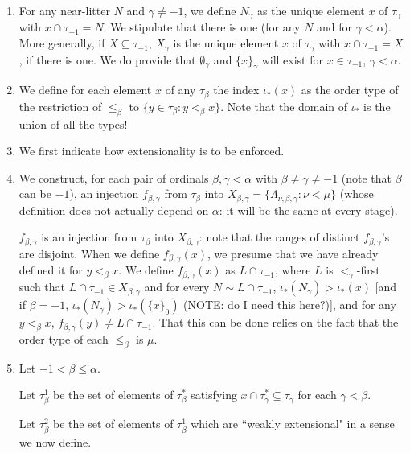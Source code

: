 \documentclass[12pt]{article}
\begin{document}
\begin{enumerate}
\item For any near-litter $N$ and $\gamma\neq -1$, we define $N_\gamma$ as the unique element $x$  of $\tau_\gamma$ with $x \cap \tau_{-1} = N$.  We stipulate that there is one (for any $N$ and for $\gamma<\alpha$).  More generally, if
$X \subseteq \tau_{-1}$, $X_\gamma$ is the unique element $x$ of $\tau_\gamma$ with $x \cap \tau_{-1} = X$, if there is one.  We do provide that $\emptyset_\gamma$ and $\{x\}_\gamma$ will exist
for $x \in \tau_{-1}$, $\gamma<\alpha$.

\item We define for each element $x$ of any $\tau_\beta$ the index $\iota_*(x)$
as the order type of the restriction of $\leq_\beta$ to $\{y \in \tau_\beta:y <_\beta x\}$.  Note that the domain of $\iota_*$ is the union of all the types!

\item We first indicate how extensionality is to be enforced.  

\item We construct, for each pair of ordinals $\beta,\gamma<\alpha$ with $\beta \neq \gamma\neq -1$ (note that $\beta$ can be $-1$),  an injection $f_{\beta,\gamma}$ from $\tau_\beta$ into $X_{\beta,\gamma} = \{\Lambda_{\nu,\beta,\gamma}:\nu<\mu\}$  (whose definition does not actually depend on $\alpha$:  it will be the same at every stage).

 $f_{\beta,\gamma}$ is an injection from $\tau_\beta$ into $X_{\beta,\gamma}$:  note that the ranges of distinct $f_{\beta,\gamma}$'s are disjoint.
When we define $f_{\beta,\gamma}(x)$, we presume that we have already defined it for $y <_\beta x$.
We define $f_{\beta,\gamma}(x)$ as $L\cap \tau_{-1}$, where $L$ is $<_\gamma$-first such that $L\cap \tau_{-1} \in X_{\beta,\gamma}$ and for every $N \sim L \cap \tau_{-1}$, $\iota_*(N_\gamma)>\iota_*(x)$ [and if $\beta=-1$, $\iota_*(N_\gamma)>\iota_*(\{x\}_0)$ (NOTE:  do I need this here?)], and for any $y<_\beta x$, $f_{\beta,\gamma}(y) \neq L\cap \tau_{-1}$.  That this can be done relies on the fact that the order type of each $\leq_\beta$ is $\mu$.

\item Let $-1<\beta\leq \alpha$.


Let $\tau_\beta^1$ be the set of elements of $\tau_\beta^*$ satisfying $x \cap \tau^*_\gamma \subseteq \tau_\gamma$ for each $\gamma<\beta$.

Let $\tau_\beta^2$ be the set of elements of $\tau_\beta^1$ which are ``weakly extensional" in a sense we now define.


\end{enumerate}
\end{document}
